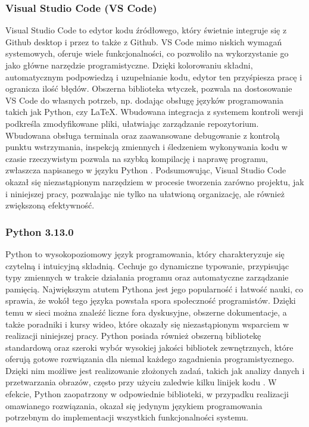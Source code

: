 \documentclass[a4paper,twoside,12pt]{book}
\begin{document}
\subsubsection{Visual Studio Code (VS Code)}

Visual Studio Code to edytor kodu źródłowego, który świetnie integruje się z Github desktop i przez to także z Github. VS Code mimo niskich wymagań systemowych, oferuje wiele funkcjonalności, co pozwoliło na wykorzystanie go jako główne narzędzie programistyczne. Dzięki kolorowaniu składni, automatycznym podpowiedzą i uzupełnianie kodu, edytor ten przyśpiesza pracę i ogranicza ilość błędów. Obszerna biblioteka wtyczek, pozwala na dostosowanie VS Code do własnych potrzeb, np. dodając obsługę języków programowania takich jak Python, czy \LaTeX. Wbudowana integracja z systemem kontroli wersji podkreśla zmodyfikowane pliki, ułatwiając zarządzanie repozytorium. Wbudowana obsługa terminala oraz zaawansowane debugowanie z kontrolą punktu wstrzymania, inspekcją zmiennych i śledzeniem wykonywania kodu w czasie rzeczywistym pozwala na szybką kompilację i naprawę programu, zwłaszcza napisanego w języku Python \cite{bib:VSCode-Essentials}. Podsumowując, Visual Studio Code okazał się niezastąpionym narzędziem w procesie tworzenia zarówno projektu, jak i niniejszej pracy, pozwalając nie tylko na ułatwioną organizację, ale również zwiększoną efektywność.

\subsubsection{Python 3.13.0}

Python to wysokopoziomowy język programowania, który charakteryzuje się czytelną i intuicyjną składnią. Cechuje go dynamiczne typowanie, przypisując typy zmiennych w trakcie działania programu oraz automatyczne zarządzanie pamięcią. Największym atutem Pythona jest jego popularność i łatwość nauki, co sprawia, że wokół tego języka powstała spora społeczność programistów. Dzięki temu w sieci można znaleźć liczne fora dyskusyjne, obszerne dokumentacje, a także poradniki i kursy wideo, które okazały się niezastąpionym wsparciem w realizacji niniejszej pracy. Python posiada również obszerną bibliotekę standardową oraz szeroki wybór wysokiej jakości bibliotek zewnętrznych, które oferują gotowe rozwiązania dla niemal każdego zagadnienia programistycznego. Dzięki nim możliwe jest realizowanie złożonych zadań, takich jak analizy danych i przetwarzania obrazów, często przy użyciu zaledwie kilku linijek kodu \cite{bib:Python-a-byte}. W efekcie, Python zaopatrzony w odpowiednie biblioteki, w przypadku realizacji omawianego rozwiązania, okazał się jedynym językiem programowania potrzebnym do implementacji wszystkich funkcjonalności systemu.
\end{document}
